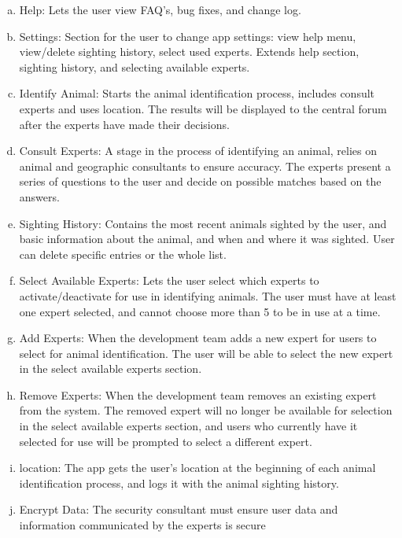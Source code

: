 \documentclass[]{article}
\begin{document}
\begin{enumerate}[a)]
	\item Help: Lets the user view FAQ's, bug fixes, and change log.

	\item Settings: Section for the user to change app settings: view help menu, view/delete sighting history, select used experts. Extends help section, sighting history, and selecting available experts.

	\item Identify Animal: Starts the animal identification process, includes consult experts and uses location. The results will be displayed to the central forum after the experts have made their decisions.

	\item Consult Experts: A stage in the process of identifying an animal, relies on animal and geographic consultants to ensure accuracy. The experts present a series of questions to the user and decide on possible matches based on the answers.

	\item Sighting History: Contains the most recent animals sighted by the user, and basic information about the animal, and when and where it was sighted. User can delete specific entries or the whole list.

	\item Select Available Experts: Lets the user select which experts to activate/deactivate for use in identifying animals. The user must have at least one expert selected, and cannot choose more than 5 to be in use at a time.

	\item Add Experts: When the development team adds a new expert for users to select for animal identification. The user will be able to select the new expert in the select available experts section.

	\item Remove Experts: When the development team removes an existing expert from the system. The removed expert will no longer be available for selection in the select available experts section, and users who currently have it selected for use will be prompted to select a different expert.

	\item location: The app gets the user's location at the beginning of each animal identification process, and logs it with the animal sighting history.

	\item Encrypt Data: The security consultant must ensure user data and information communicated by the experts is secure
\end{enumerate}
\end{document}
